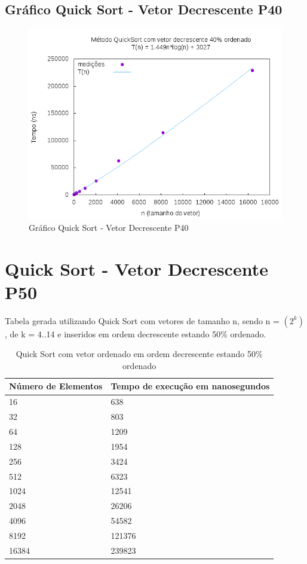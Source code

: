 \documentclass[12pt,a4paper,twoside]{report}
\begin{document}
\subsection{Gráfico Quick Sort - Vetor Decrescente P40}
\begin{figure}[H]
    \centering
    \includegraphics[width=0.7\linewidth]{graficos/QuickSort/vIntDecrescenteP40/vIntDecrescenteP40.png}
  \caption{Gráfico Quick Sort - Vetor Decrescente P40}
\end{figure}

\section{Quick Sort - Vetor Decrescente P50}
Tabela gerada utilizando Quick Sort com vetores de tamanho n, sendo n = $(2^k)$, de k = 4..14 e inseridos em ordem decrescente estando 50\% ordenado.
\begin{table}[H]
\centering
\caption{Quick Sort com vetor ordenado em ordem decrescente estando 50\% ordenado}
\label{my-label}
\begin{tabular}{|l|l|}
\hline
\multicolumn{1}{|c|}{\textbf{Número de Elementos}} & \multicolumn{1}{c|}{\textbf{Tempo de execução em nanosegundos}} \\ \hline
16 & 638 \\ \hline
32 & 803 \\ \hline
64 & 1209 \\ \hline
128 & 1954 \\ \hline
256 & 3424 \\ \hline
512 & 6323 \\ \hline
1024 & 12541 \\ \hline
2048 & 26206 \\ \hline
4096 & 54582 \\ \hline
8192 & 121376 \\ \hline
16384 & 239823 \\ \hline
\end{tabular}
\end{table}
\end{document}
